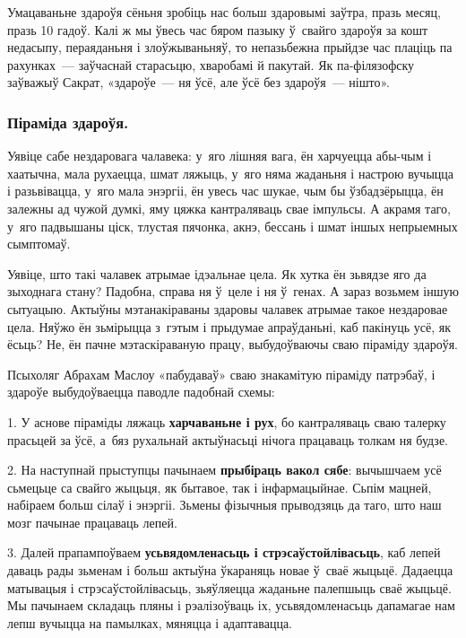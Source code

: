 
Умацаваньне здароўя сёньня зробіць нас больш здаровымі заўтра, празь месяц, празь 10 гадоў. Калі ж мы ўвесь час бяром пазыку ў~свайго здароўя за кошт недасыпу, пераяданьня і злоўжываньняў, то непазьбежна прыйдзе час плаціць па рахунках~--- заўчаснай старасьцю, хваробамі й пакутай. Як па-філязофску заўважыў Сакрат, «здароўе~--- ня ўсё, але ўсё без здароўя~--- нішто».

\subsubsection{Піраміда здароўя.}

Уявіце сабе нездаровага чалавека: у~яго лішняя вага, ён харчуецца абы-чым і хаатычна, мала рухаецца, шмат ляжыць, у~яго няма жаданьня і настрою вучыцца і разьвівацца, у~яго мала энэргіі, ён увесь час шукае, чым бы ўзбадзёрыцца, ён залежны ад чужой думкі, яму цяжка кантраляваць свае імпульсы. А акрамя таго, у~яго падвышаны ціск, тлустая пячонка, акнэ, бессань і шмат іншых непрыемных сымптомаў.

Уявіце, што такі чалавек атрымае ідэальнае цела. Як хутка ён зьвядзе яго да зыходнага стану? Падобна, справа ня ў~целе і ня ў~генах. А зараз возьмем іншую сытуацыю. Актыўны мэтанакіраваны здаровы чалавек атрымае такое нездаровае цела. Няўжо ён зьмірыцца з~гэтым і прыдумае апраўданьні, каб пакінуць усё, як ёсьць? Не, ён пачне мэтаскіраваную працу, выбудоўваючы сваю піраміду здароўя.

Псыхоляг Абрахам Маслоу «пабудаваў» сваю знакамітую піраміду патрэбаў, і здароўе выбудоўваецца паводле падобнай схемы:

1. У аснове піраміды ляжаць \textbf{харчаваньне і рух}, бо кантраляваць сваю талерку прасьцей за ўсё, а~бяз рухальнай актыўнасьці нічога працаваць толкам ня будзе.

2. На наступнай прыступцы пачынаем \textbf{прыбіраць вакол сябе}: вычышчаем усё сьмецьце са свайго жыцьця, як бытавое, так і інфармацыйнае. Сьпім мацней, набіраем больш сілаў і энэргіі. Зьмены фізычныя прыводзяць да таго, што наш мозг пачынае працаваць лепей.

3. Далей прапампоўваем \textbf{усьвядомленасьць і стрэсаўстойлівасьць}, каб лепей даваць рады зьменам і больш актыўна ўкараняць новае ў~сваё жыцьцё. Дадаецца матывацыя і стрэсаўстойлівасьць, зьяўляецца жаданьне палепшыць сваё жыцьцё. Мы пачынаем складаць пляны і рэалізоўваць іх, усьвядомленасьць дапамагае нам лепш вучыцца на памылках, мяняцца і адаптавацца.


